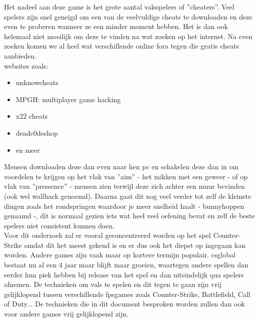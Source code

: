 \documentclass[pdftex,a4paper,12pt,twoside]{report}
\begin{document}
Het nadeel aan deze game is het grote aantal valsspelers of ''\gls{cheat}ers''. Veel spelers zijn snel geneigd om een van de veelvuldige \gls{cheat}s te downloaden en deze even te proberen wanneer ze een minder moment hebben. Het is dan ook helemaal niet moeilijk om deze te vinden na wat zoeken op het internet. Na even zoeken komen we al heel wat verschillende online fora tegen die gratis \gls{cheat}s aanbieden.
\\

websites zoals: 
\begin{itemize}
\item unknowcheats
\item MPGH: multiplayer game hacking
\item x22 cheats 
\item deadc0deshop
\item en meer
\\
\end{itemize}


 Mensen downloaden deze dan even naar hen pc en schakelen deze dan in om voordelen te krijgen op het vlak van ''\gls{aim}'' - het mikken met een geweer - of op vlak van ''pressence'' - mensen zien terwijl deze zich achter een muur bevinden (ook wel wallhack genoemd). Daarna gaat dit nog veel verder tot zelf de kleinste dingen zoals het rondspringen waardoor je meer snelheid haalt - bunnyhoppen genaamd -, dit is normaal gezien iets wat heel veel oefening bevat en zelf de beste spelers niet consistent kunnen doen. 
\\

Voor dit onderzoek zal er vooral geconcentreerd worden op het spel Counter-Strike omdat dit het meest gekend is en er dus ook het diepst op ingegaan kan worden. Andere games zijn vaak maar op kortere termijn populair. \gls{csglobal} bestaat nu al een 4 jaar maar blijft maar groeien, waartegen andere spellen dan eerder hun piek hebben bij release van het spel en dan uiteindelijk qua spelers afnemen. De technieken om vals te spelen en dit tegen te gaan zijn vrij gelijklopend tussen verschillende \gls{fpsgames} zoals Counter-Strike, Battlefield, Call of Duty... De technieken die in dit document besproken worden zullen dan ook voor andere games vrij gelijklopend zijn.
\\

\newpage
\end{document}
